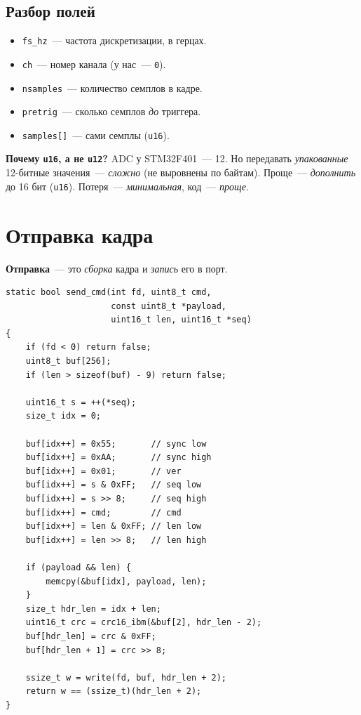 \subsection{Разбор полей}

\begin{itemize}
    \item \texttt{fs\_hz}~--- частота дискретизации, в герцах.
    \item \texttt{ch}~--- номер канала (у нас~--- \texttt{0}).
    \item \texttt{nsamples}~--- количество семплов в кадре.
    \item \texttt{pretrig}~--- сколько семплов \emph{до} триггера.
    \item \texttt{samples[]}~--- сами семплы (\texttt{u16}).
\end{itemize}

\begin{keybox}
\textbf{Почему \texttt{u16}, а не \texttt{u12}?} ADC у STM32F401~---
\SI{12}{\bit}. Но передавать \emph{упакованные} 12-битные
значения~--- \emph{сложно} (не выровнены по байтам).
Проще~--- \emph{дополнить} до 16 бит (\texttt{u16}).
Потеря~--- \emph{минимальная}, код~--- \emph{проще}.
\end{keybox}

\section{Отправка кадра}
\label{sec:protocol-send}

\textbf{Отправка}~--- это \emph{сборка} кадра и \emph{запись}
его в порт.

\begin{listing}[htbp]
\begin{verbatim}
static bool send_cmd(int fd, uint8_t cmd,
                     const uint8_t *payload,
                     uint16_t len, uint16_t *seq)
{
    if (fd < 0) return false;
    uint8_t buf[256];
    if (len > sizeof(buf) - 9) return false;

    uint16_t s = ++(*seq);
    size_t idx = 0;

    buf[idx++] = 0x55;       // sync low
    buf[idx++] = 0xAA;       // sync high
    buf[idx++] = 0x01;       // ver
    buf[idx++] = s & 0xFF;   // seq low
    buf[idx++] = s >> 8;     // seq high
    buf[idx++] = cmd;        // cmd
    buf[idx++] = len & 0xFF; // len low
    buf[idx++] = len >> 8;   // len high

    if (payload && len) {
        memcpy(&buf[idx], payload, len);
    }
    size_t hdr_len = idx + len;
    uint16_t crc = crc16_ibm(&buf[2], hdr_len - 2);
    buf[hdr_len] = crc & 0xFF;
    buf[hdr_len + 1] = crc >> 8;

    ssize_t w = write(fd, buf, hdr_len + 2);
    return w == (ssize_t)(hdr_len + 2);
}
\end{verbatim}
\caption{\texttt{send\_cmd()}~--- отправка кадра}
\label{lst:protocol-send}
\end{listing}

